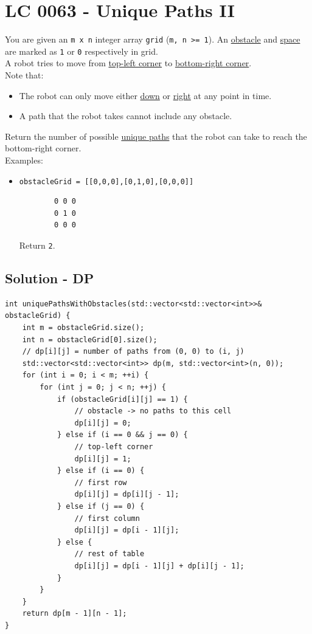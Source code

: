 \section{LC 0063 - Unique Paths II}\label{lc0063}
You are given an {\colorbox{CodeBackground}{\lstinline|m x n|}} integer array {\colorbox{CodeBackground}{\lstinline|grid|}} ({\colorbox{CodeBackground}{\lstinline|m, n >= 1|}}). An \ul{obstacle} and \ul{space} are marked as {\colorbox{CodeBackground}{\lstinline|1|}} or {\colorbox{CodeBackground}{\lstinline|0|}} respectively in grid. \\

A robot tries to move from \ul{top-left corner} to \ul{bottom-right corner}. \\

Note that:
\begin{itemize}
	\item The robot can only move either \ul{down} or \ul{right} at any point in time.
	\item A path that the robot takes cannot include any obstacle.
\end{itemize}

Return the number of possible \ul{unique paths} that the robot can take to reach the bottom-right corner.\\

Examples:
\begin{itemize}
	\item {\colorbox{CodeBackground}{\lstinline|obstacleGrid = [[0,0,0],[0,1,0],[0,0,0]]|}}
	\begin{lstlisting}
		0 0 0
		0 1 0
		0 0 0
	\end{lstlisting}
	Return {\colorbox{CodeBackground}{\lstinline|2|}}.
\end{itemize}

\subsection*{Solution - DP}
\begin{lstlisting}
int uniquePathsWithObstacles(std::vector<std::vector<int>>& obstacleGrid) {
	int m = obstacleGrid.size();
	int n = obstacleGrid[0].size();
	// dp[i][j] = number of paths from (0, 0) to (i, j)
	std::vector<std::vector<int>> dp(m, std::vector<int>(n, 0));
	for (int i = 0; i < m; ++i) {
		for (int j = 0; j < n; ++j) {
			if (obstacleGrid[i][j] == 1) {
				// obstacle -> no paths to this cell
				dp[i][j] = 0;
			} else if (i == 0 && j == 0) {
				// top-left corner
				dp[i][j] = 1;
			} else if (i == 0) {
				// first row
				dp[i][j] = dp[i][j - 1];
			} else if (j == 0) {
				// first column
				dp[i][j] = dp[i - 1][j];
			} else {
				// rest of table
				dp[i][j] = dp[i - 1][j] + dp[i][j - 1];
			}
		}
	}
	return dp[m - 1][n - 1];
}
\end{lstlisting}

